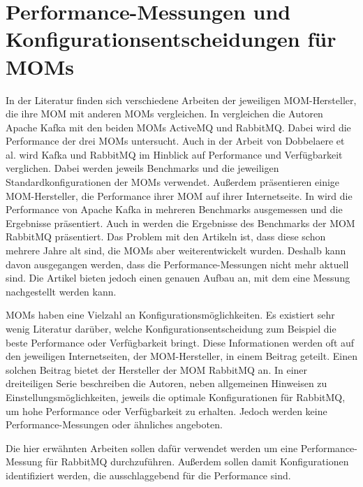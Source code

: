 \section{Performance-Messungen und Konfigurationsentscheidungen für MOMs}
\label{sec:config_mom}
In der Literatur finden sich verschiedene Arbeiten der jeweiligen MOM-Hersteller, die ihre MOM mit anderen MOMs vergleichen. In \cite{kafka} vergleichen die Autoren Apache Kafka mit den beiden MOMs ActiveMQ und RabbitMQ. Dabei wird die Performance der drei MOMs untersucht. Auch in der Arbeit von Dobbelaere et al. \cite{Dobbelaere2017} wird Kafka und RabbitMQ im Hinblick auf Performance und Verfügbarkeit verglichen. Dabei werden jeweils Benchmarks und die jeweiligen Standardkonfigurationen der MOMs verwendet. Außerdem präsentieren einige MOM-Hersteller, die Performance ihrer MOM auf ihrer Internetseite. In \cite{kafkaconfig} wird die Performance von Apache Kafka in mehreren Benchmarks ausgemessen und die Ergebnisse präsentiert. Auch in \cite{rabbitperf} werden die Ergebnisse des Benchmarks der MOM RabbitMQ präsentiert. Das Problem mit den Artikeln ist, dass diese schon mehrere Jahre alt sind, die MOMs aber weiterentwickelt wurden. Deshalb kann davon ausgegangen werden, dass die Performance-Messungen nicht mehr aktuell sind. Die Artikel bieten jedoch einen genauen Aufbau an, mit dem eine Messung nachgestellt werden kann. \par
MOMs haben eine Vielzahl an Konfigurationsmöglichkeiten. Es existiert sehr wenig Literatur darüber, welche Konfigurationsentscheidung zum Beispiel die beste Performance oder Verfügbarkeit bringt. Diese Informationen werden oft auf den jeweiligen Internetseiten, der MOM-Hersteller, in einem Beitrag geteilt. Einen solchen Beitrag bietet der Hersteller der MOM RabbitMQ an. In einer dreiteiligen Serie \cite{rabbitconfig} beschreiben die Autoren, neben allgemeinen Hinweisen zu Einstellungsmöglichkeiten, jeweils die optimale Konfigurationen für RabbitMQ, um hohe Performance oder Verfügbarkeit zu erhalten. Jedoch werden keine Performance-Messungen oder ähnliches angeboten.\par
Die hier erwähnten Arbeiten sollen dafür verwendet werden um eine Performance-Messung für RabbitMQ durchzuführen. Außerdem sollen damit Konfigurationen identifiziert werden, die ausschlaggebend für die Performance sind.

